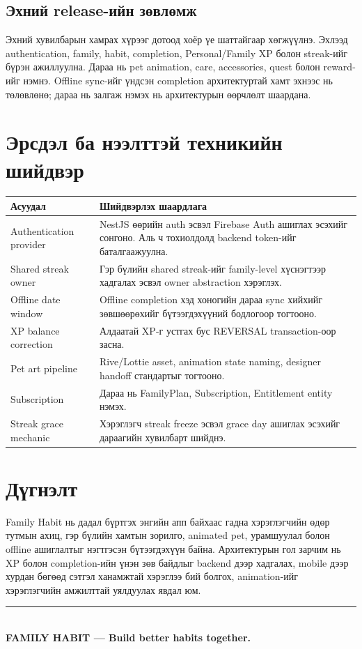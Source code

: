 \documentclass[12pt,a4paper,oneside]{report}
\begin{document}
\section{Эхний release-ийн зөвлөмж}
Эхний хувилбарын хамрах хүрээг дотоод хоёр үе шаттайгаар хөгжүүлнэ. Эхлээд authentication, family, habit, completion, Personal/Family XP болон streak-ийг бүрэн ажиллуулна. Дараа нь pet animation, care, accessories, quest болон reward-ийг нэмнэ. Offline sync-ийг үндсэн completion архитектуртай хамт эхнээс нь төлөвлөнө; дараа нь залгаж нэмэх нь архитектурын өөрчлөлт шаардана.

\chapter{Эрсдэл ба нээлттэй техникийн шийдвэр}

\begin{longtable}{p{}p{}}
\toprule
\textbf{Асуудал} & \textbf{Шийдвэрлэх шаардлага}\\
\midrule
Authentication provider & NestJS өөрийн auth эсвэл Firebase Auth ашиглах эсэхийг сонгоно. Аль ч тохиолдолд backend token-ийг баталгаажуулна.\\
Shared streak owner & Гэр бүлийн shared streak-ийг family-level хүснэгтээр хадгалах эсвэл owner abstraction хэрэглэх.\\
Offline date window & Offline completion хэд хоногийн дараа sync хийхийг зөвшөөрөхийг бүтээгдэхүүний бодлогоор тогтооно.\\
XP balance correction & Алдаатай XP-г устгах бус REVERSAL transaction-оор засна.\\
Pet art pipeline & Rive/Lottie asset, animation state naming, designer handoff стандартыг тогтооно.\\
Subscription & Дараа нь FamilyPlan, Subscription, Entitlement entity нэмэх.\\
Streak grace mechanic & Хэрэглэгч streak freeze эсвэл grace day ашиглах эсэхийг дараагийн хувилбарт шийднэ.\\
\bottomrule
\end{longtable}

\chapter*{Дүгнэлт}
Family Habit нь дадал бүртгэх энгийн апп байхаас гадна хэрэглэгчийн өдөр тутмын ахиц, гэр бүлийн хамтын зорилго, animated pet, урамшуулал болон offline ашиглалтыг нэгтгэсэн бүтээгдэхүүн байна. Архитектурын гол зарчим нь XP болон completion-ийн үнэн зөв байдлыг backend дээр хадгалах, mobile дээр хурдан бөгөөд сэтгэл ханамжтай хэрэглээ бий болгох, animation-ийг хэрэглэгчийн амжилттай уялдуулах явдал юм.

\vfill
\begin{center}
\textcolor{primary}{\rule{0.55\textwidth}{1pt}}\\
\textbf{FAMILY HABIT — Build better habits together.}
\end{center}
\end{document}
